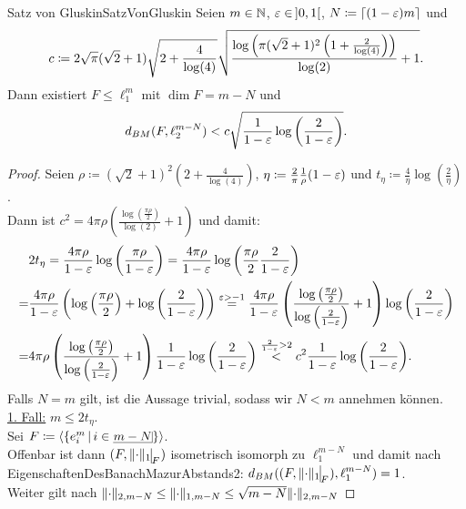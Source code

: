 \begin{satz}{Satz von Gluskin}{SatzVonGluskin}
Seien $m \in \mathbb{N}$, $\varepsilon \in\!\ ]0, 1[$, $N\coloneqq  \left\lceil{(1-\varepsilon)m}\right\rceil$ und
\[c \coloneqq  2\sqrt \pi (\sqrt 2 +1) \sqrt{2 + \frac 4{\log(4)}}
\sqrt{\frac{\log\left(\pi(\sqrt 2+1)^2\left(1+\frac 2{\log(4)}\right) \right)}
{\log(2)} + 1}\text.\]
Dann existiert $F \le \ell_1^m$ mit $\dim F = m - N$ und
\[d_{BM}(F,\ell_2^{m-N})<
c\sqrt{\frac 1{1-\varepsilon}\log\left(\frac 2{1-\varepsilon}\right)}\text.\]
\end{satz}
\begin{proof}
Seien $\rho \coloneqq  (\sqrt 2 +1)^2\left(2+\frac 4{\log(4)} \right)$,
$\eta \coloneqq  \frac 2 \pi \frac 1 \rho (1-\varepsilon)$ und
$t_\eta \coloneqq  \frac 4 \eta \log\left(\frac 2 \eta \right)$.\\
Dann ist $c^2=4\pi\rho \left(\frac{\log\left(\frac{\pi\rho}2\right)}{\log(2)}+1\right)$ und damit:
\begin{align}
&2t_\eta = \frac{4\pi\rho}{1-\varepsilon}\log\left(\frac{\pi\rho}{1-\varepsilon} \right)
= \frac{4\pi\rho}{1-\varepsilon}\log\left(\frac{\pi\rho}{2}\frac{2}{1-\varepsilon} \right)
\notag\\
=& \frac{4\pi\rho}{1-\varepsilon}\left(\log\left(\frac{\pi\rho}2 \right) 
 + \log\left( \frac 2 {1-\varepsilon}\right) \right)
 \overset{\varepsilon>-1}=
 \frac{4\pi\rho}{1-\varepsilon}\left(\frac{\log\left(\frac{\pi\rho}2
 \right)}{\log\left( \frac 2 {1-\varepsilon}\right)}+1 \right)\log\left(\frac 2
 {1-\varepsilon} \right)\notag\\
 =&4\pi\rho\left(\frac{\log\left(\frac{\pi\rho}2 \right)}
 {\log\left( \frac 2 {1-\varepsilon}\right)}+1 \right)
 \frac 1{1-\varepsilon}\log\left(\frac 2 {1-\varepsilon} \right)
 \overset{\frac 2{1-\varepsilon}>2}<
 c^2
 \frac 1{1-\varepsilon}\log\bigg(\frac 2 {1-\varepsilon} \bigg). \label{svgeq:1}
\end{align}
Falls $N=m$ gilt, ist die Aussage trivial, sodass wir $N<m$ annehmen können.\\
\underline{1. Fall:} $m \le 2 t_\eta$.\\
Sei $F \coloneqq  \left\langle \menge{e_i^m}{i \in \haken {m-N}}\right\rangle$.\\
Offenbar ist dann $(F,\restrict{\norm\cdot_1}{F})$ isometrisch isomorph zu
$\ell_1^{m-N}$ und damit nach~
{EigenschaftenDesBanachMazurAbstands2}:
$d_{BM}((F,\restrict{\norm\cdot_1}{F}), \ell_1^{m-N}) = 1$.\\
Weiter gilt nach
$\lVert\cdot\rVert_{2, m-N} \le\lVert\cdot\rVert_{1, m-N} \le \sqrt{m-N}\lVert\cdot\rVert_{2, m-N}$

\end{proof}
